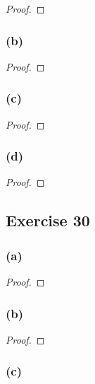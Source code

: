\documentclass[14pt]{extarticle}
\begin{document}
\begin{proof}

\end{proof}

\subsubsection{(b)}

\begin{proof}

\end{proof}

\subsubsection{(c)}

\begin{proof}

\end{proof}

\subsubsection{(d)}

\begin{proof}

\end{proof}

\subsection{Exercise 30}

\subsubsection{(a)}

\begin{proof}

\end{proof}

\subsubsection{(b)}

\begin{proof}

\end{proof}

\subsubsection{(c)}
\end{document}
